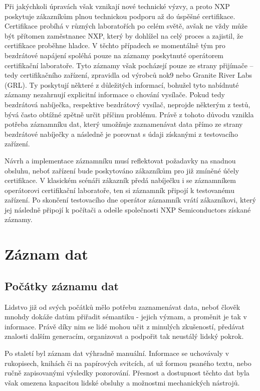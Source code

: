 Při jakýchkoli úpravách však vznikají nové technické výzvy, a proto NXP poskytuje zákazníkům plnou technickou podporu až do úspěšné certifikace. Certifikace probíhá v různých laboratořích po celém světě, avšak ne vždy může být přítomen zaměstnanec NXP, který by dohlížel na celý proces a zajistil, že certifikace proběhne hladce. V těchto případech se momentálně tým pro bezdrátové napájení spoléhá pouze na záznamy poskytnuté operátorem certifikační laboratoře. Tyto záznamy však pocházejí pouze ze strany přijímače – tedy certifikačního zařízení, zpravidla od výrobců nok9 nebo Granite River Labs (GRL). Ty poskytují některé z důležitých informací, bohužel tyto nabídnuté záznamy nezahrnují explicitní informace o chování vysílače. Pokud tedy bezdrátová nabíječka, respektive bezdrátový vysílač, neprojde některým z testů, bývá často obtížné zpětně určit příčinu problému. Právě z tohoto důvodu vznikla potřeba záznamníku dat, který umožňuje zaznamenávat data přímo ze strany bezdrátové nabíječky a následně je porovnat s údaji získanými z testovacího zařízení. \cite{nxp_wireless_charging_team}

Návrh a implementace záznamníku musí reflektovat požadavky na snadnou obsluhu, neboť zařízení bude poskytováno zákazníkům pro již zmíněné účely certifikace. V klasickém scénáři zákazník předá nabíječku i se záznamníkem operátorovi certifikační laboratoře, ten si záznamník připojí k testovanému zařízení. Po skončení testovacího dne operátor záznamník vrátí zákazníkovi, který jej následně připojí k počítači a odešle společnosti NXP Semiconductors získané záznamy.


\chapter{Záznam dat}
\label{zaznam_dat}

\section{Počátky záznamu dat}
\label{pocatky}
Lidstvo již od svých počátků mělo potřebu zaznamenávat data, neboť člověk mnohdy dokáže datům přiřadit sémantiku - jejich význam, a proměnit je tak v informace. Právě díky nim se lidé mohou učit z minulých zkušeností, předávat znalosti dalším generacím, organizovat a podpořit tak neustálý lidský pokrok. 

Po staletí byl záznam dat výhradně manuální. Informace se uchovávaly v rukopisech, knihách či na papírových svitcích, ať už formou psaného textu, nebo ručně zapisovanými výsledky pozorování. Přesnost a dostupnost těchto dat byla však omezena kapacitou lidské obsluhy a možnostmi mechanických nástrojů.


